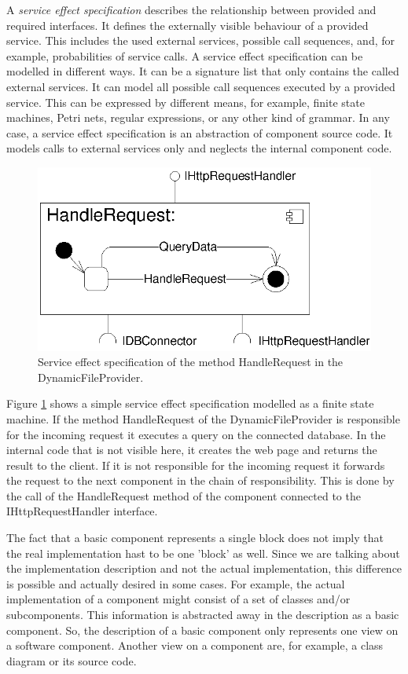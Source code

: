 A \emph{service effect specification} describes the relationship between provided and required interfaces. It defines the externally visible behaviour of a provided service. This includes the used external services, possible call sequences, and, for example, probabilities of service calls. A service effect specification can be modelled in different ways. It can be a signature list that only contains the called external services. It can model all possible call sequences executed by a provided service. This can be expressed by different means, for example, finite state machines, Petri nets, regular expressions, or any other kind of grammar. In any case, a service effect specification is an abstraction of component source code. It models calls to external services only and neglects the internal component code.

\begin{figure}[htbp]
\centering
\includegraphics[scale=0.85]{example/HandleRequestSEFF}
\caption{Service effect specification of the method HandleRequest in the DynamicFileProvider.}
\label{fig:seff}
\end{figure}

Figure \ref{fig:seff} shows a simple service effect specification modelled as a finite state machine. If the method HandleRequest of the DynamicFileProvider is responsible for the incoming request it executes a query on the connected database. In the internal code that is not visible here, it creates the web page and returns the result to the client. If it is not responsible for the incoming request it forwards the request to the next component in the chain of responsibility. This is done by the call of the HandleRequest method of the component connected to the IHttpRequestHandler interface.

The fact that a basic component represents a single block does not imply that the real implementation hast to be one 'block' as well. Since we are talking about the implementation description and not the actual implementation, this difference is possible and actually desired in some cases. For example, the actual implementation of a component might consist of a set of classes and/or subcomponents. This information is abstracted away in the description as a basic component. So, the description of a basic component only represents one view on a software component. Another view on a component are, for example, a class diagram or its source code.


